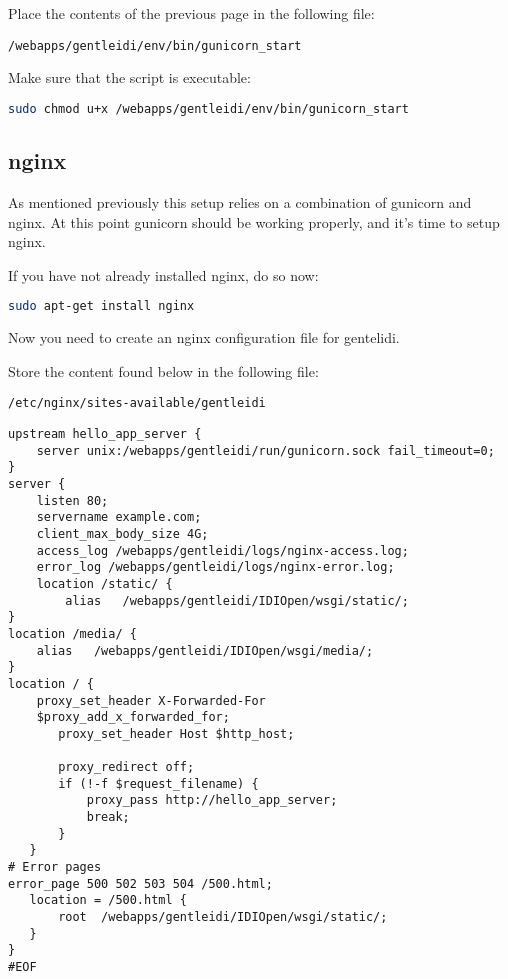 Place the contents of the previous page in the following file:
\begin{verbatim}
/webapps/gentleidi/env/bin/gunicorn_start
\end{verbatim}

Make sure that the script is executable:

\begin{lstlisting}[language=bash]
sudo chmod u+x /webapps/gentleidi/env/bin/gunicorn_start
\end{lstlisting}

\subsection{nginx}
As mentioned previously this setup relies on a combination of gunicorn
and nginx. At this point gunicorn should be working properly, and
it's time to setup nginx.

If you have not already installed nginx, do so now:

\begin{lstlisting}[language=bash]
sudo apt-get install nginx
\end{lstlisting}

Now you need to create an nginx configuration file for gentelidi.

Store the content found below in the following file:
\begin{verbatim}
/etc/nginx/sites-available/gentleidi
\end{verbatim}

\begin{verbatim}
upstream hello_app_server {
    server unix:/webapps/gentleidi/run/gunicorn.sock fail_timeout=0;
}
server {
    listen 80;
    servername example.com;
    client_max_body_size 4G;
    access_log /webapps/gentleidi/logs/nginx-access.log;
    error_log /webapps/gentleidi/logs/nginx-error.log;
    location /static/ {
        alias   /webapps/gentleidi/IDIOpen/wsgi/static/;
}
location /media/ {
    alias   /webapps/gentleidi/IDIOpen/wsgi/media/;
}
location / {
    proxy_set_header X-Forwarded-For
    $proxy_add_x_forwarded_for;
       proxy_set_header Host $http_host;

       proxy_redirect off;
       if (!-f $request_filename) {
           proxy_pass http://hello_app_server;
           break;
       }
   }
# Error pages
error_page 500 502 503 504 /500.html;
   location = /500.html {
       root  /webapps/gentleidi/IDIOpen/wsgi/static/;
   }
}
#EOF
\end{verbatim}

